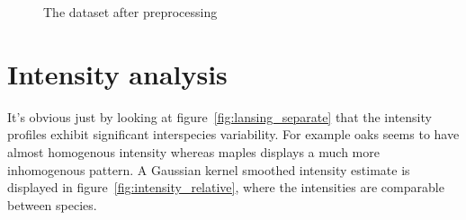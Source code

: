 \documentclass[12pt,a4paper,oneside,article]{memoir}
\begin{document}
\begin{figure}[htb]
  \begin{adjustwidth}{-2in}{-2in}
	  \centering
  \end{adjustwidth}
  \caption{The dataset after preprocessing}
  \label{fig:lansing_processed}
\end{figure}


\section{Intensity analysis}

It's obvious just by looking at figure~\ref{fig:lansing_separate} that 
the intensity profiles exhibit significant interspecies variability. For example
oaks seems to have almost homogenous intensity whereas maples
displays a much more inhomogenous pattern. A Gaussian kernel smoothed intensity 
estimate is displayed in figure~\ref{fig:intensity_relative}, where
the intensities are comparable between species. 
\end{document}

